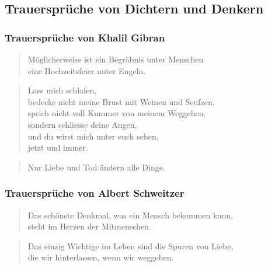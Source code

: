 \documentclass[ngerman,a4paper,11pt]{scrreprt}
\begin{document}
\clearpage

\subsection{Trauersprüche von Dichtern und Denkern}
\label{sec-1-1-1-3}

\subsubsection*{Trauersprüche von Khalil Gibran}
\label{sec-1-1-1-3-1}

\begin{verse}
Möglicherweise ist ein Begräbnis unter Menschen \\
eine Hochzeitsfeier unter Engeln. \\
\end{verse}

\begin{verse}
Lass mich schlafen, \\
bedecke nicht meine Brust mit Weinen und Seufzen, \\
sprich nicht voll Kummer von meinem Weggehen, \\
sondern schliesse deine Augen, \\
und du wirst mich unter euch sehen, \\
jetzt und immer. \\
\end{verse}

\begin{verse}
Nur Liebe und Tod ändern alle Dinge. \\
\end{verse}

\subsubsection*{Trauersprüche von Albert Schweitzer}
\label{sec-1-1-1-3-2}

\begin{verse}
Das schönste Denkmal, was ein Mensch bekommen kann, \\
steht im Herzen der Mitmenschen. \\
\end{verse}

\begin{verse}
Das einzig Wichtige im Leben sind die Spuren von Liebe, \\
die wir hinterlassen, wenn wir weggehen. \\
\end{verse}
\end{document}
